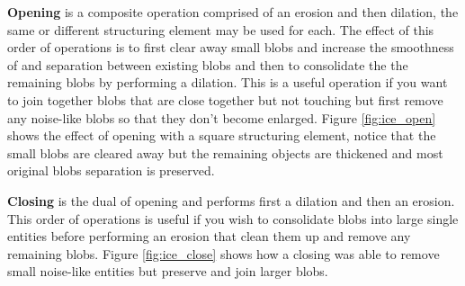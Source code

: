 \textbf{Opening} is a composite operation comprised of an erosion and then dilation, the same or different structuring element may be used for each. The effect of this order of operations is to first clear away small blobs and increase the smoothness of and separation between existing blobs and then to consolidate the the remaining blobs by performing a dilation. This is a useful operation if you want to join together blobs that are close together but not touching but first remove any noise-like blobs so that they don't become enlarged. Figure \ref{fig:ice_open} shows the effect of opening with a square structuring element, notice that the small blobs are cleared away but the remaining objects are thickened and most original blobs separation is preserved. 

\textbf{Closing} is the dual of opening and performs first a dilation and then an erosion. This order of operations is useful if you wish to consolidate blobs into large single entities before performing an erosion that clean them up and remove any remaining blobs. Figure \ref{fig:ice_close} shows how a closing was able to remove small noise-like entities but preserve and join larger blobs.

